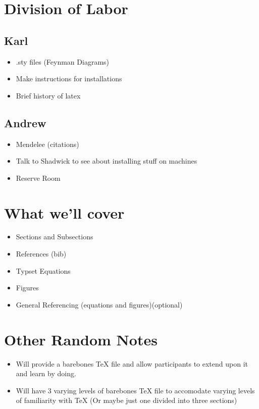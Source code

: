 \documentclass[12pt]{article}
\begin{document}
\maketitle

\section{Division of Labor}
\subsection{Karl}

\begin{itemize}
\item .sty files (Feynman Diagrams)
\item Make instructions for installations
\item Brief history of latex
\end{itemize}

\subsection{Andrew}

\begin{itemize}
\item Mendelee (citations)
\item Talk to Shadwick to see about installing stuff on machines
\item Reserve Room
\end{itemize}

\section{What we'll cover}

\begin{itemize}
\item Sections and Subsections
\item References (bib)
\item Typset Equations
\item Figures
\item General Referencing (equations and figures)(optional) 
\end{itemize}

\section{Other Random Notes}
\begin{itemize}
\item Will provide a barebones TeX file and allow participants
to extend upon it and learn by doing.
\item Will have 3 varying levels of barebones TeX file to accomodate
varying levels of familiarity with TeX (Or maybe just one divided into
three sections)
\end{itemize}
\end{document}
